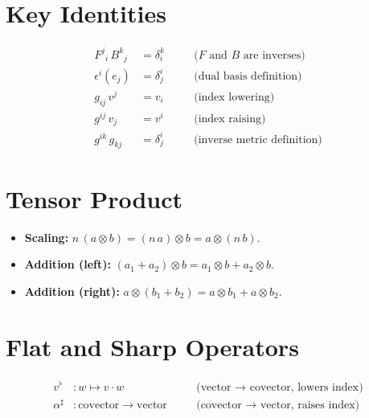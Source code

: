 \documentclass[12pt, a4paper]{report}
\theoremstyle{definition}
\theoremstyle{plain}
\theoremstyle{remark}
\begin{document}
\section{Key Identities}

\begin{align}
    F^{j}{}_{i}\, B^{k}{}_{j} &= \delta^{k}_{i}
        &\quad& \text{($F$ and $B$ are inverses)} \\
    \epsilon^{i}(e_j) &= \delta^{i}_{j}
        &\quad& \text{(dual basis definition)} \\
    g_{ij}\, v^{j} &= v_i
        &\quad& \text{(index lowering)} \\
    g^{ij}\, v_j &= v^{i}
        &\quad& \text{(index raising)} \\
    g^{ik}\, g_{kj} &= \delta^{i}_{j}
        &\quad& \text{(inverse metric definition)}
\end{align}

\section{Tensor Product}

\begin{itemize}[nosep]
    \item \textbf{Scaling:}
          $n\,(a \otimes b) = (n\,a) \otimes b = a \otimes (n\,b)$.
    \item \textbf{Addition (left):}
          $(a_1 + a_2) \otimes b = a_1 \otimes b + a_2 \otimes b$.
    \item \textbf{Addition (right):}
          $a \otimes (b_1 + b_2) = a \otimes b_1 + a \otimes b_2$.
\end{itemize}

\section{Flat and Sharp Operators}

\begin{align}
    v^{\flat} &: w \mapsto v \cdot w
        &\quad& \text{(vector $\to$ covector, lowers index)} \\
    \alpha^{\sharp} &: \text{covector} \to \text{vector}
        &\quad& \text{(covector $\to$ vector, raises index)}
\end{align}
\end{document}

